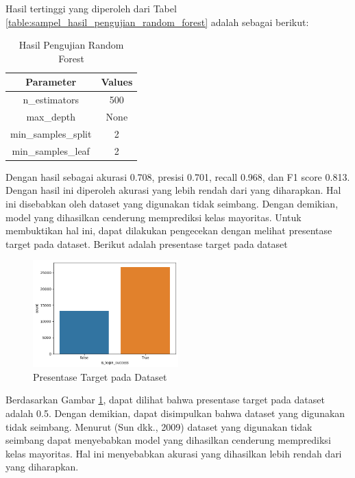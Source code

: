 Hasil tertinggi yang diperoleh dari Tabel \ref{table:sampel_hasil_pengujian_random_forest} adalah sebagai berikut:

\begin{table}[H]
    \centering
    \begin{tabular}{|c|c|}
    \hline
    \textbf{Parameter} & \textbf{Values} \\
    \hline
    n\_estimators & 500 \\
    \hline
    max\_depth & None \\
    \hline
    min\_samples\_split & 2 \\
    \hline
    min\_samples\_leaf & 2 \\
    \hline
    \end{tabular}
    \caption{Hasil Pengujian Random Forest}
    \label{table:2}
    \end{table}

Dengan hasil sebagai akurasi 0.708, presisi 0.701, recall 0.968, dan F1 score 0.813. Dengan hasil ini diperoleh akurasi yang lebih rendah dari yang diharapkan. Hal ini disebabkan oleh dataset yang digunakan tidak seimbang. Dengan demikian, model yang dihasilkan cenderung memprediksi kelas mayoritas. Untuk membuktikan hal ini, dapat dilakukan pengecekan dengan melihat presentase target pada dataset. Berikut adalah presentase target pada dataset

\begin{figure}[H]
    \centering
    \includegraphics[width=0.5\textwidth]{contents/chapter-6/visualize_class.png}
    \caption{Presentase Target pada Dataset}
    \label{fig:visualize_target}
\end{figure}

Berdasarkan Gambar \ref{fig:visualize_target}, dapat dilihat bahwa presentase target pada dataset adalah 0.5. Dengan demikian, dapat disimpulkan bahwa dataset yang digunakan tidak seimbang. Menurut (Sun dkk., 2009) dataset yang digunakan tidak seimbang dapat menyebabkan model yang dihasilkan cenderung memprediksi kelas mayoritas. Hal ini menyebabkan akurasi yang dihasilkan lebih rendah dari yang diharapkan.





